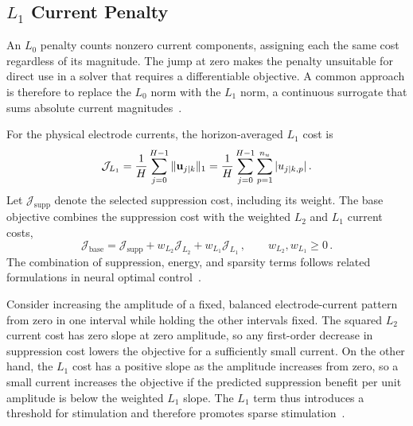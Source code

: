 \subsection{\texorpdfstring{$L_1$}{L1} Current Penalty}

An $L_0$ penalty counts nonzero current components, assigning each the same cost regardless of its magnitude.
The jump at zero makes the penalty unsuitable for direct use in a solver that requires a differentiable objective.
A common approach is therefore to replace the $L_0$ norm with the $L_1$ norm, a continuous surrogate that sums absolute current magnitudes~\cite{Nagahara2016}.

For the physical electrode currents, the horizon-averaged $L_1$ cost is
%
\begin{equation*}
    \mathcal J_{L_1}
    =\frac{1}{H}\sum_{j=0}^{H-1}\|\mathbf u_{j|k}\|_1
    =\frac{1}{H}\sum_{j=0}^{H-1}\sum_{p=1}^{n_{u}}|u_{j|k,p}|\,.
\end{equation*}
%
Let $\mathcal J_{\mathrm{supp}}$ denote the selected suppression cost, including its weight.
The base objective combines the suppression cost with the weighted $L_2$ and $L_1$ current costs,
%
\begin{equation}
    \mathcal J_{\mathrm{base}}
    =\mathcal J_{\mathrm{supp}}
     +w_{L_2}\mathcal J_{L_2}
     +w_{L_1}\mathcal J_{L_1}\,,
    \qquad w_{L_2},w_{L_1}\geq0\,.
    \label{eq:mpc_base_objective}
\end{equation}
%
The combination of suppression, energy, and sparsity terms follows related formulations in neural optimal control~\cite{Chouzouris2021,Salfenmoser2022,Salfenmoser2023}.

Consider increasing the amplitude of a fixed, balanced electrode-current pattern from zero in one interval while holding the other intervals fixed.
The squared $L_2$ current cost has zero slope at zero amplitude, so any first-order decrease in suppression cost lowers the objective for a sufficiently small current.
On the other hand, the $L_1$ cost has a positive slope as the amplitude increases from zero, so a small current increases the objective if the predicted suppression benefit per unit amplitude is below the weighted $L_1$ slope.
The $L_1$ term thus introduces a threshold for stimulation and therefore promotes sparse stimulation~\cite{Nagahara2016}.

